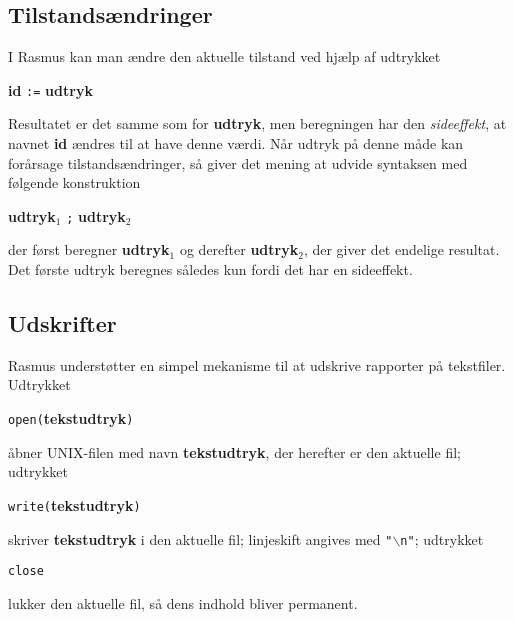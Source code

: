 \subsection{Tilstands\ae{}ndringer}
I {\sc Rasmus} kan man \ae{}ndre den aktuelle tilstand ved hj\ae{}lp af 
udtrykket
\begin{center}
{\bf id} \verb":=" {\bf udtryk}
\end{center}
Resultatet er det samme som for {\bf udtryk}, men beregningen har
den {\em sideeffekt}, at navnet {\bf id} \ae{}ndres til at have denne
v\ae{}rdi. N\aa{}r udtryk p\aa{} denne m\aa{}de kan for\aa{}rsage tilstands\ae{}ndringer, s\aa{}
giver det mening at udvide syntaksen med f\o{}lgende konstruktion
\begin{center}
{\bf udtryk$_1$} \verb";" {\bf udtryk$_2$}
\end{center}
der f\o{}rst beregner {\bf udtryk$_1$} og derefter {\bf udtryk$_2$},
der giver det endelige resultat. Det f\o{}rste udtryk beregnes s\aa{}ledes
kun fordi det har en sideeffekt.


\subsection{Udskrifter}
{\sc Rasmus} underst\o{}tter en simpel mekanisme til at udskrive 
rapporter p\aa{} tekstfiler. Udtrykket 
\begin{center}
\verb"open("{\bf tekstudtryk}\verb")"
\end{center}
\aa{}bner UNIX-filen med navn {\bf tekstudtryk}, der herefter er den aktuelle
fil; udtrykket
\begin{center}
\verb"write("{\bf tekstudtryk}\verb")"
\end{center}
skriver {\bf tekstudtryk} i den aktuelle fil; linjeskift angives med
\verb'"'$\backslash$\verb'n"'; udtrykket 
\begin{center}
\verb"close"
\end{center}
lukker den aktuelle fil, s\aa{} dens indhold bliver permanent.

